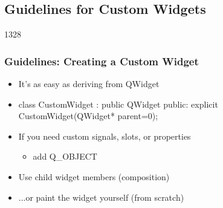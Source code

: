 %
%
%
%

\subsection{Guidelines for Custom Widgets}

\begin{slide}[fragile]{1328} \frametitle{Guidelines: Creating a Custom Widget}
  \begin{itemize}
    \item It's as easy as deriving from QWidget
    \item[] \begin{cpp}
class CustomWidget : public QWidget
{
public:
  explicit CustomWidget(QWidget* parent=0);
}
\end{cpp}           
  \item If you need custom signals, slots, or properties
  \begin{itemize}
    \item add Q\_OBJECT
  \end{itemize} 
  \item Use child widget members (composition)
  \item ...or paint the widget yourself (from scratch)
\end{itemize}
\end{slide}
